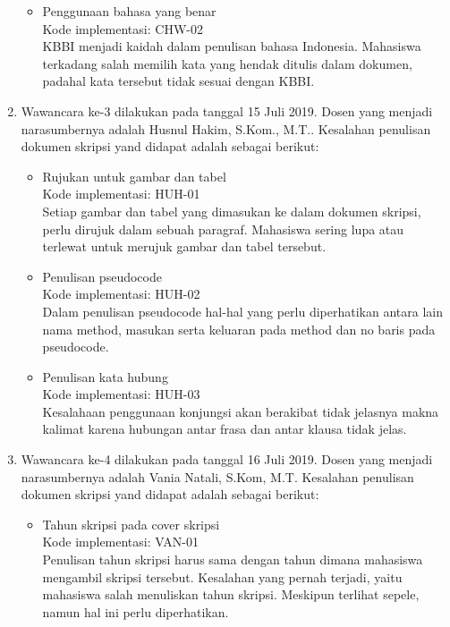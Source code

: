 \begin{enumerate}
\begin{itemize}
			\item Penggunaan bahasa yang benar \\
			Kode implementasi: CHW-02 \\
			KBBI menjadi kaidah dalam penulisan bahasa Indonesia. Mahasiswa terkadang salah memilih kata yang hendak ditulis dalam dokumen, padahal kata tersebut tidak sesuai dengan KBBI.	
			
		\end{itemize}
		
	\item Wawancara ke-3 dilakukan pada tanggal 15 Juli 2019. Dosen yang menjadi narasumbernya adalah Husnul Hakim, S.Kom., M.T.. Kesalahan penulisan dokumen skripsi yand didapat adalah sebagai berikut:
	
		\begin{itemize}
			\item Rujukan untuk gambar dan tabel \\	
			Kode implementasi: HUH-01 \\
			Setiap gambar dan tabel yang dimasukan ke dalam dokumen skripsi, perlu dirujuk dalam sebuah paragraf. Mahasiswa sering lupa atau terlewat untuk merujuk gambar dan tabel tersebut.			
			
			\item Penulisan pseudocode \\
			Kode implementasi: HUH-02 \\
			Dalam penulisan pseudocode hal-hal yang perlu diperhatikan antara lain nama method, masukan serta keluaran pada method dan no baris pada pseudocode.			
			
			\item Penulisan kata hubung \\
			Kode implementasi: HUH-03 \\
			Kesalahaan penggunaan konjungsi akan berakibat tidak jelasnya makna kalimat karena hubungan antar frasa dan antar klausa tidak jelas.
			
		\end{itemize}
		
	\item Wawancara ke-4 dilakukan pada tanggal 16 Juli 2019. Dosen yang menjadi narasumbernya adalah Vania Natali, S.Kom, M.T. Kesalahan penulisan dokumen skripsi yand didapat adalah sebagai berikut:
	
		\begin{itemize}
			\item Tahun skripsi pada cover skripsi \\
			Kode implementasi: VAN-01 \\
			Penulisan tahun skripsi harus sama dengan tahun dimana mahasiswa mengambil skripsi tersebut. Kesalahan yang pernah terjadi, yaitu mahasiswa salah menuliskan tahun skripsi. Meskipun terlihat sepele, namun hal ini perlu diperhatikan.			
			

\end{itemize}
\end{enumerate}
